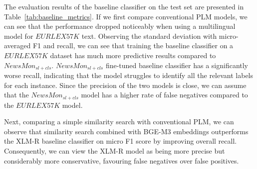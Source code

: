 \clearpage 

\begin{table}[h]
    \centering
    \caption{Baseline XLM-R classifier performance metrics for $EURLEX57K$ and $NewsMon_{sl+cls}$ corpora. For BERT PLM, we show metrics reported by \textcite{chalkidis-etal-2019-large}; for the XLM-R model, we show our baseline classifier metrics. We report at K = corpus label cardinality~\parencite{chalkidis-etal-2019-large}.}
\label{tab:baseline_metrics}
\end{table}

The evaluation results of the baseline classifier on the test set are presented in Table~\ref{tab:baseline_metrics}.
If we first compare conventional PLM models, we can see that the performance dropped noticeably when using a multilingual model for $EURLEX57K$ text. 
Observing the standard deviation with micro-averaged F1 and recall, we can see that training the baseline classifier on a $EURLEX57K$ dataset has much more predictive results compared to $NewsMon_{sl+cls}$. 
$NewsMon_{sl+cls}$ fine-tuned baseline classifier has a significantly worse recall, indicating that the model struggles to identify all the relevant labels for each instance. 
Since the precision of the two models is close, we can assume that the $NewsMon_{sl+cls}$ model has a higher rate of false negatives compared to the $EURLEX57K$ model.

Next, comparing a simple similarity search with conventional PLM, we can observe that similarity search combined with BGE-M3 embeddings outperforms the XLM-R baseline classifier on micro F1 score by improving overall recall.
Consequently, we can view the XLM-R model as being more precise but considerably more conservative, favouring false negatives over false positives. 

